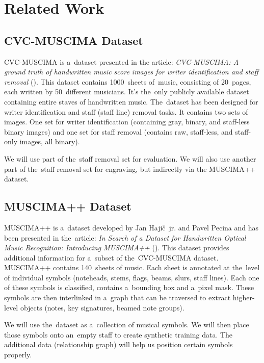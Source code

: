 \chapter{Related Work}
\label{chap:RelatedWork}


\section{CVC-MUSCIMA Dataset}
\label{sec:CvcMuscima}

CVC-MUSCIMA is a~dataset presented in the article: \emph{CVC-MUSCIMA: A ground truth of handwritten music score images for writer identification and staff removal} (\cite{CvcMuscima}). This dataset contains 1000~sheets of~music, consisting of 20~pages, each written by 50~different musicians. It's the~only publicly available dataset containing entire staves of handwritten music. The~dataset has been designed for writer identification and staff (staff line) removal tasks. It contains two sets of images. One set for writer identification (containing gray, binary, and staff-less binary images) and one set for staff removal (contains raw, staff-less, and staff-only images, all binary).

We will use part of the~staff removal set for evaluation. We will also use another part of the~staff removal set for engraving, but indirectly via the MUSCIMA++ dataset.


\section{MUSCIMA++ Dataset}

MUSCIMA++ is a~dataset developed by Jan Hajič~jr. and Pavel Pecina and has been presented in the~article: \emph{In Search of a Dataset for Handwritten Optical Music Recognition: Introducing MUSCIMA++} (\cite{MuscimaPP}). This dataset provides additional information for a~subset of the~CVC-MUSCIMA dataset. MUSCIMA++ contains 140~sheets of music. Each sheet is annotated at the~level of individual symbols (noteheads, stems, flags, beams, slurs, staff lines). Each one of these symbols is classified, contains a~bounding box and a~pixel mask. These symbols are then interlinked in a~graph that can be traversed to extract higher-level objects (notes, key signatures, beamed note groups).

We will use the~dataset as a~collection of musical symbols. We will then place those symbols onto an~empty staff to create synthetic training data. The additional data (relationship graph) will help us position certain symbols properly.


